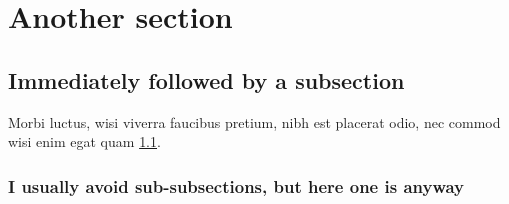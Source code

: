 \documentclass{rntz}
\begin{document}
\section{Another section}\label{sec:two}
\subsection{Immediately followed by a subsection}\label{sec:two-one}

\lipsum[6]

\begin{conjecture}
  Morbi luctus, wisi viverra faucibus pretium, nibh est placerat odio, nec
  commod wisi enim egat quam \cref{sec:two-one}.
\end{conjecture}

\subsubsection{I usually avoid sub-subsections, but here one is anyway}

\lipsum[7-8]
\end{document}
